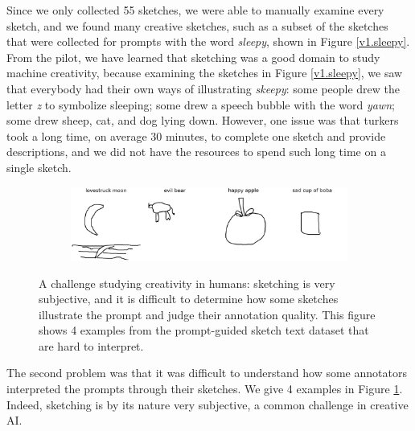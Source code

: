 Since we only collected 55 sketches, we were able to manually examine every sketch, and we found many creative sketches, such as a subset of the sketches that were collected for prompts with the word \textit{sleepy}, shown in Figure \ref{v1.sleepy}. From the pilot, we have learned that sketching was a good domain to study machine creativity, because examining the sketches in Figure \ref{v1.sleepy}, we saw that everybody had their own ways of illustrating \textit{skeepy}: some people drew the letter \textit{z} to symbolize sleeping; some drew a speech bubble with the word \textit{yawn}; some drew sheep, cat, and dog lying down.  
However, one issue was that turkers took a long time, on average 30 minutes, to complete one sketch and provide descriptions, and we did not have the resources to spend such long time on a single sketch. 

\begin{figure}[!htb]
\begin{subfigure}{\textwidth}
\centering
\includegraphics[width=\linewidth]{data_collection/v1_hard_to_understand_sketches.png}  
\end{subfigure}
\caption{A challenge studying creativity in humans: sketching is very subjective, and it is difficult to determine how some sketches illustrate the prompt and judge their annotation quality. This figure shows 4 examples from the prompt-guided sketch text dataset that are hard to interpret.}
\label{v1.hard_to_understand}
\end{figure}

The second problem was that it was difficult to understand how some annotators interpreted the prompts through their sketches. We give 4 examples in Figure \ref{v1.hard_to_understand}.
Indeed, sketching is by its nature very subjective, a common challenge in creative AI.    

